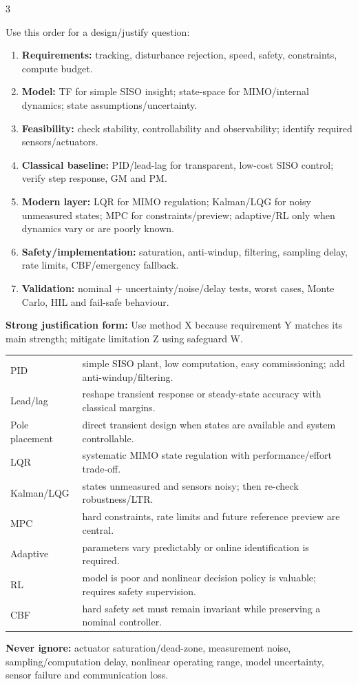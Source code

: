 \documentclass[a4paper,8pt]{extarticle}
\newcommand{\topicdot}[1]{\tikz[baseline=-0.6ex]\fill[#1] (0,0) circle (0.52ex);}
\newcommand{\Edot}{\topicdot{examDot}}
\newcommand{\mybox}[2]{
\begin{tcolorbox}[
  enhanced,
  colback=lightblue!7!white,
  colframe=lightblue!78!black,
  boxrule=0.38pt,
  boxsep=0.7pt,
  left=1.7pt,right=1.7pt,top=1.5pt,bottom=1.5pt,
  arc=0.8pt,outer arc=0.8pt,
  title={\small\textbf{#1}},
  fonttitle=\bfseries,
  coltitle=black,
  before skip=1.5pt,after skip=1.5pt,
  fontupper=\fontsize{5.55pt}{6.30pt}\selectfont\RaggedRight
]
#2
\end{tcolorbox}}
\newcommand{\qrow}[2]{%
\textbf{#1} #2\par}
\newcommand{\tinyhead}[1]{\textbf{#1}\;}
\begin{document}
\begin{multicols}{3}
\mybox{Q9: System-Synthesis Answer Framework \Edot}{
Use this order for a design/justify question:
\begin{enumerate}[leftmargin=*,nosep]
\item \textbf{Requirements:} tracking, disturbance rejection, speed, safety, constraints, compute budget.
\item \textbf{Model:} TF for simple SISO insight; state-space for MIMO/internal dynamics; state assumptions/uncertainty.
\item \textbf{Feasibility:} check stability, controllability and observability; identify required sensors/actuators.
\item \textbf{Classical baseline:} PID/lead-lag for transparent, low-cost SISO control; verify step response, GM and PM.
\item \textbf{Modern layer:} LQR for MIMO regulation; Kalman/LQG for noisy unmeasured states; MPC for constraints/preview; adaptive/RL only when dynamics vary or are poorly known.
\item \textbf{Safety/implementation:} saturation, anti-windup, filtering, sampling delay, rate limits, CBF/emergency fallback.
\item \textbf{Validation:} nominal + uncertainty/noise/delay tests, worst cases, Monte Carlo, HIL and fail-safe behaviour.
\end{enumerate}
\qrow{Strong justification form:}{Use method X because requirement Y matches its main strength; mitigate limitation Z using safeguard W.}
}

\mybox{Method Selection --- One-Line Justifications \Edot}{
\begin{tabularx}{\linewidth}{@{}lX@{}}
PID & simple SISO plant, low computation, easy commissioning; add anti-windup/filtering.\\
Lead/lag & reshape transient response or steady-state accuracy with classical margins.\\
Pole placement & direct transient design when states are available and system controllable.\\
LQR & systematic MIMO state regulation with performance/effort trade-off.\\
Kalman/LQG & states unmeasured and sensors noisy; then re-check robustness/LTR.\\
MPC & hard constraints, rate limits and future reference preview are central.\\
Adaptive & parameters vary predictably or online identification is required.\\
RL & model is poor and nonlinear decision policy is valuable; requires safety supervision.\\
CBF & hard safety set must remain invariant while preserving a nominal controller.\\
\end{tabularx}
\tinyhead{Never ignore:} actuator saturation/dead-zone, measurement noise, sampling/computation delay, nonlinear operating range, model uncertainty, sensor failure and communication loss.
}


\end{multicols}
\end{document}
